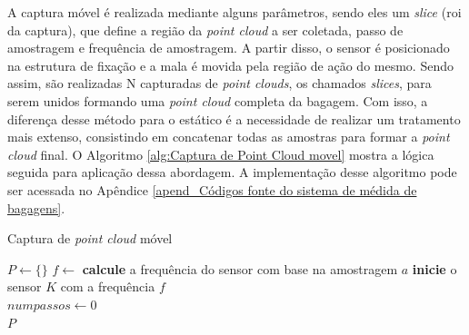 
    A captura móvel é realizada mediante alguns parâmetros, sendo eles um \textit{slice} (roi da captura), que define a região da \textit{point cloud} a ser coletada, passo de amostragem e frequência de amostragem. A partir disso, o sensor é posicionado na estrutura de fixação e a mala é movida pela região de ação do mesmo. Sendo assim, são realizadas N capturadas de \textit{point clouds}, os chamados \textit{slices}, para serem unidos formando uma \textit{point cloud} completa da bagagem. Com isso, a diferença desse método para o estático é a necessidade de realizar um tratamento mais extenso, consistindo em concatenar todas as amostras para formar a \textit{point cloud} final. O Algoritmo \ref{alg:Captura de Point Cloud movel} mostra a lógica seguida para aplicação dessa abordagem. A implementação desse algoritmo pode ser acessada no Apêndice \ref{apend_Códigos fonte do sistema de médida de bagagens}.



\begin{algorithm}[h!]
\caption{Captura de \textit{point cloud} móvel}\label{alg:Captura de Point Cloud movel}

\;
$P \gets \{\}$ \;
$f \gets$ \textbf{calcule} a frequência do sensor com base na amostragem $a$\;
\textbf{inicie} o sensor $K$ com a frequência $f$\\
$numpassos \gets 0$ \\
\Retorna $P$
\end{algorithm}

